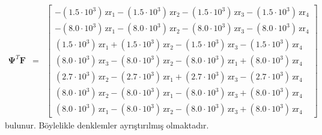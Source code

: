 \documentclass[a4paper]{report}
\begin{document}
\begin{eqnarray*}
\mathbf{\Psi}^T\mathbf{F}&=&\left[\begin{array}{c}  - \left(1.5\cdot 10^3\right)\, \mathrm{zr}_{1} - \left(1.5\cdot 10^3\right)\, \mathrm{zr}_{2} - \left(1.5\cdot 10^3\right)\, \mathrm{zr}_{3} - \left(1.5\cdot 10^3\right)\, \mathrm{zr}_{4}\\  - \left(8.0\cdot 10^3\right)\, \mathrm{zr}_{1} - \left(8.0\cdot 10^3\right)\, \mathrm{zr}_{2} - \left(8.0\cdot 10^3\right)\, \mathrm{zr}_{3} - \left(8.0\cdot 10^3\right)\, \mathrm{zr}_{4}\\ \left(1.5\cdot 10^3\right)\, \mathrm{zr}_{1} + \left(1.5\cdot 10^3\right)\, \mathrm{zr}_{2} - \left(1.5\cdot 10^3\right)\, \mathrm{zr}_{3} - \left(1.5\cdot 10^3\right)\, \mathrm{zr}_{4}\\ \left(8.0\cdot 10^3\right)\, \mathrm{zr}_{3} - \left(8.0\cdot 10^3\right)\, \mathrm{zr}_{2} - \left(8.0\cdot 10^3\right)\, \mathrm{zr}_{1} + \left(8.0\cdot 10^3\right)\, \mathrm{zr}_{4}\\ \left(2.7\cdot 10^3\right)\, \mathrm{zr}_{2} - \left(2.7\cdot 10^3\right)\, \mathrm{zr}_{1} + \left(2.7\cdot 10^3\right)\, \mathrm{zr}_{3} - \left(2.7\cdot 10^3\right)\, \mathrm{zr}_{4}\\ \left(8.0\cdot 10^3\right)\, \mathrm{zr}_{2} - \left(8.0\cdot 10^3\right)\, \mathrm{zr}_{1} - \left(8.0\cdot 10^3\right)\, \mathrm{zr}_{3} + \left(8.0\cdot 10^3\right)\, \mathrm{zr}_{4}\\ \left(8.0\cdot 10^3\right)\, \mathrm{zr}_{1} - \left(8.0\cdot 10^3\right)\, \mathrm{zr}_{2} - \left(8.0\cdot 10^3\right)\, \mathrm{zr}_{3} + \left(8.0\cdot 10^3\right)\, \mathrm{zr}_{4} \end{array}
\right]
\end{eqnarray*}
bulunur. Böylelikle denklemler ayrıştırılmış olmaktadır.
\end{document}
